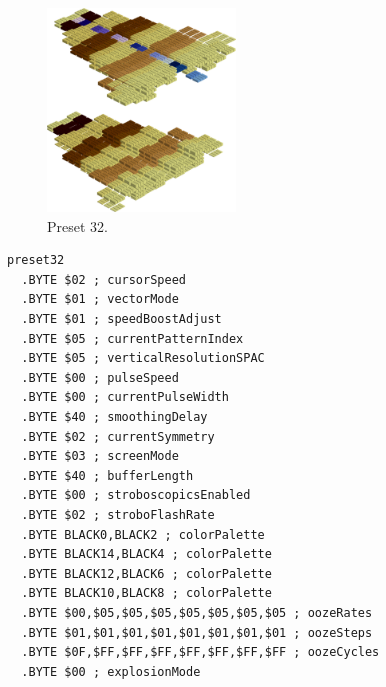 \vspace*{0.5cm}
\begin{minipage}[b]{0.48\linewidth}
\begin{figure}[H]                                                          
  \centering                                                             
  \begin{adjustbox}{width=5cm,center}                                   
  \includegraphics[width=5cm]{src/colorspace_presets/preset32-45.png}%
  \end{adjustbox}                                                        
\caption*{Preset 32.}                                           
\end{figure}                                                               
\end{minipage}
\hspace{0.1cm}
\begin{minipage}[b]{0.48\linewidth}                                                                         
\begin{lstlisting}[basicstyle=\ttfamily\tiny]
preset32
  .BYTE $02 ; cursorSpeed
  .BYTE $01 ; vectorMode
  .BYTE $01 ; speedBoostAdjust
  .BYTE $05 ; currentPatternIndex
  .BYTE $05 ; verticalResolutionSPAC
  .BYTE $00 ; pulseSpeed
  .BYTE $00 ; currentPulseWidth
  .BYTE $40 ; smoothingDelay
  .BYTE $02 ; currentSymmetry
  .BYTE $03 ; screenMode
  .BYTE $40 ; bufferLength
  .BYTE $00 ; stroboscopicsEnabled
  .BYTE $02 ; stroboFlashRate
  .BYTE BLACK0,BLACK2 ; colorPalette
  .BYTE BLACK14,BLACK4 ; colorPalette
  .BYTE BLACK12,BLACK6 ; colorPalette
  .BYTE BLACK10,BLACK8 ; colorPalette
  .BYTE $00,$05,$05,$05,$05,$05,$05,$05 ; oozeRates
  .BYTE $01,$01,$01,$01,$01,$01,$01,$01 ; oozeSteps
  .BYTE $0F,$FF,$FF,$FF,$FF,$FF,$FF,$FF ; oozeCycles
  .BYTE $00 ; explosionMode
\end{lstlisting}
\end{minipage}


